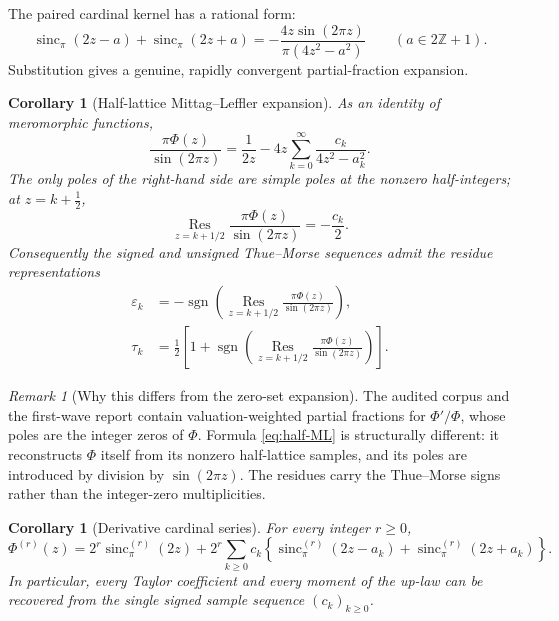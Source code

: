 \documentclass[11pt]{article}
\newtheorem{corollary}[theorem]{Corollary}
\theoremstyle{definition}
\theoremstyle{remark}
\newtheorem{remark}[theorem]{Remark}
\newcommand{\sgn}{\operatorname{sgn}}
\newcommand{\eps}{\varepsilon}
\newcommand{\sincpi}{\operatorname{sinc}_{\pi}}
\begin{document}
The paired cardinal kernel has a rational form:
\begin{equation}
 \sincpi(2z-a)+\sincpi(2z+a)
 =-\frac{4z\sin(2\pi z)}{\pi(4z^2-a^2)}
 \qquad(a\in2\mathbb Z+1).                                \label{eq:paired-cardinal}
\end{equation}
Substitution gives a genuine, rapidly convergent partial-fraction expansion.

\begin{corollary}[Half-lattice Mittag--Leffler expansion]
\label{cor:half-ML}
As an identity of meromorphic functions,
\begin{equation}
\boxed{
 \frac{\pi\Phi(z)}{\sin(2\pi z)}
 =\frac1{2z}
  -4z\sum_{k=0}^{\infty}
   \frac{c_k}{4z^2-a_k^2}.}                                \label{eq:half-ML}
\end{equation}
The only poles of the right-hand side are simple poles at the nonzero half-integers; at
\(z=k+\tfrac12\),
\begin{equation}
 \operatorname*{Res}_{z=k+1/2}
 \frac{\pi\Phi(z)}{\sin(2\pi z)}=-\frac{c_k}{2}.           \label{eq:half-residue}
\end{equation}
Consequently the signed and unsigned Thue--Morse sequences admit the residue
representations
\begin{align}
 \eps_k
 &=-\sgn\!\left(
 \operatorname*{Res}_{z=k+1/2}
 \frac{\pi\Phi(z)}{\sin(2\pi z)}\right),                 \label{eq:tm-residue-sign}\\
 \tau_k
 &=\frac12\left[1+
 \sgn\!\left(
 \operatorname*{Res}_{z=k+1/2}
 \frac{\pi\Phi(z)}{\sin(2\pi z)}\right)\right].         \label{eq:tm-residue-bit}
\end{align}
\end{corollary}

\begin{remark}[Why this differs from the zero-set expansion]
The audited corpus and the first-wave report contain valuation-weighted partial fractions
for \(\Phi'/\Phi\), whose poles are the integer zeros of \(\Phi\).  Formula
\eqref{eq:half-ML} is structurally different: it reconstructs \(\Phi\) itself from its
nonzero half-lattice samples, and its poles are introduced by division by
\(\sin(2\pi z)\).  The residues carry the Thue--Morse signs rather than the
integer-zero multiplicities.
\end{remark}

\begin{corollary}[Derivative cardinal series]
\label{cor:derivative-cardinal}
For every integer \(r\ge0\),
\begin{equation}
 \Phi^{(r)}(z)
 =2^r\sincpi^{(r)}(2z)
 +2^r\sum_{k\ge0}c_k
 \left\{\sincpi^{(r)}(2z-a_k)+\sincpi^{(r)}(2z+a_k)\right\}.
                                                               \label{eq:derivative-cardinal}
\end{equation}
In particular, every Taylor coefficient and every moment of the up-law can be recovered
from the single signed sample sequence \((c_k)_{k\ge0}\).
\end{corollary}
\end{document}
